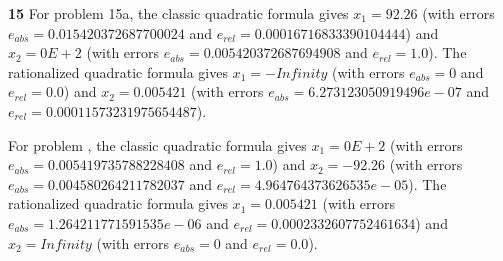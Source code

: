 \documentclass{article}
\begin{document}

\textbf{15}
For problem 15a, the classic quadratic formula gives $x_1 = 92.26$ (with errors $e_{abs} = 0.015420372687700024$ and $e_{rel} = 0.00016716833390104444$) and $x_2 = 0E+2$ (with errors $e_{abs} = 0.005420372687694908$ and $e_{rel} = 1.0$). The rationalized quadratic formula gives $x_1 = -Infinity$ (with errors $e_{abs} = 0$ and $e_{rel} = 0.0$) and $x_2 = 0.005421$ (with errors $e_{abs} = 6.273123050919496e-07$ and $e_{rel} = 0.00011573231975654487$).

For problem , the classic quadratic formula gives $x_1 = 0E+2$ (with errors $e_{abs} = 0.005419735788228408$ and $e_{rel} = 1.0$) and $x_2 = -92.26$ (with errors $e_{abs} = 0.004580264211782037$ and $e_{rel} = 4.964764373626535e-05$). The rationalized quadratic formula gives $x_1 = 0.005421$ (with errors $e_{abs} = 1.264211771591535e-06$ and $e_{rel} = 0.0002332607752461634$) and $x_2 = Infinity$ (with errors $e_{abs} = 0$ and $e_{rel} = 0.0$).

\end{document}
